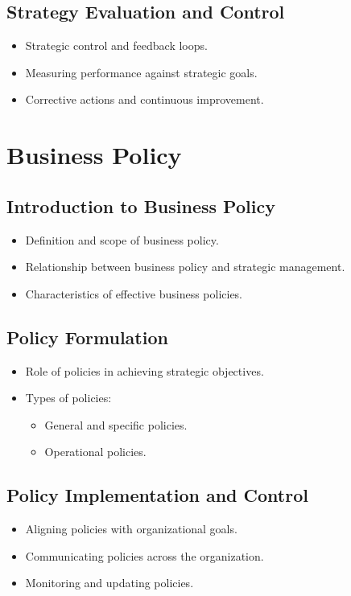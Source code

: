 \subsection{Strategy Evaluation and Control}
\begin{itemize}
    \item Strategic control and feedback loops.
    \item Measuring performance against strategic goals.
    \item Corrective actions and continuous improvement.
\end{itemize}

\section{Business Policy}

\subsection{Introduction to Business Policy}
\begin{itemize}
    \item Definition and scope of business policy.
    \item Relationship between business policy and strategic management.
    \item Characteristics of effective business policies.
\end{itemize}

\subsection{Policy Formulation}
\begin{itemize}
    \item Role of policies in achieving strategic objectives.
    \item Types of policies:
    \begin{itemize}
        \item General and specific policies.
        \item Operational policies.
    \end{itemize}
\end{itemize}

\subsection{Policy Implementation and Control}
\begin{itemize}
    \item Aligning policies with organizational goals.
    \item Communicating policies across the organization.
    \item Monitoring and updating policies.
\end{itemize}


